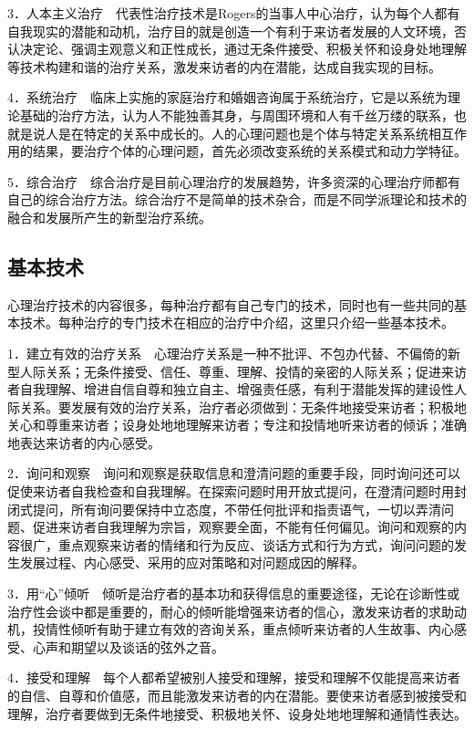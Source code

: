 3．人本主义治疗　代表性治疗技术是Rogers的当事人中心治疗，认为每个人都有自我现实的潜能和动机，治疗目的就是创造一个有利于来访者发展的人文环境，否认决定论、强调主观意义和正性成长，通过无条件接受、积极关怀和设身处地理解等技术构建和谐的治疗关系，激发来访者的内在潜能，达成自我实现的目标。

4．系统治疗　临床上实施的家庭治疗和婚姻咨询属于系统治疗，它是以系统为理论基础的治疗方法，认为人不能独善其身，与周围环境和人有千丝万缕的联系，也就是说人是在特定的关系中成长的。人的心理问题也是个体与特定关系系统相互作用的结果，要治疗个体的心理问题，首先必须改变系统的关系模式和动力学特征。

5．综合治疗　综合治疗是目前心理治疗的发展趋势，许多资深的心理治疗师都有自己的综合治疗方法。综合治疗不是简单的技术杂合，而是不同学派理论和技术的融合和发展所产生的新型治疗系统。

\subsection{基本技术}

心理治疗技术的内容很多，每种治疗都有自己专门的技术，同时也有一些共同的基本技术。每种治疗的专门技术在相应的治疗中介绍，这里只介绍一些基本技术。

1．建立有效的治疗关系　心理治疗关系是一种不批评、不包办代替、不偏倚的新型人际关系；无条件接受、信任、尊重、理解、投情的亲密的人际关系；促进来访者自我理解、增进自信自尊和独立自主、增强责任感，有利于潜能发挥的建设性人际关系。要发展有效的治疗关系，治疗者必须做到：无条件地接受来访者；积极地关心和尊重来访者；设身处地地理解来访者；专注和投情地听来访者的倾诉；准确地表达来访者的内心感受。

2．询问和观察　询问和观察是获取信息和澄清问题的重要手段，同时询问还可以促使来访者自我检查和自我理解。在探索问题时用开放式提问，在澄清问题时用封闭式提问，所有询问要保持中立态度，不带任何批评和指责语气，一切以弄清问题、促进来访者自我理解为宗旨，观察要全面，不能有任何偏见。询问和观察的内容很广，重点观察来访者的情绪和行为反应、谈话方式和行为方式，询问问题的发生发展过程、内心感受、采用的应对策略和对问题成因的解释。

3．用“心”倾听　倾听是治疗者的基本功和获得信息的重要途径，无论在诊断性或治疗性会谈中都是重要的，耐心的倾听能增强来访者的信心，激发来访者的求助动机，投情性倾听有助于建立有效的咨询关系，重点倾听来访者的人生故事、内心感受、心声和期望以及谈话的弦外之音。

4．接受和理解　每个人都希望被别人接受和理解，接受和理解不仅能提高来访者的自信、自尊和价值感，而且能激发来访者的内在潜能。要使来访者感到被接受和理解，治疗者要做到无条件地接受、积极地关怀、设身处地地理解和通情性表达。

